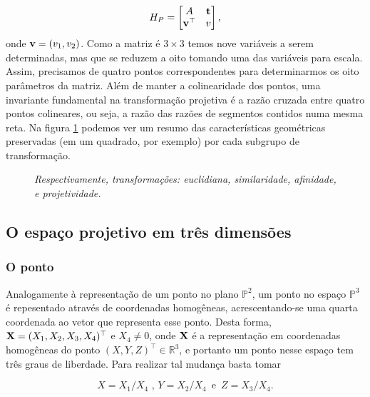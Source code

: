 \begin{equation*}
H_P=
\begin{bmatrix}
A&{\bf t}\\
{\bf v}^\top&v
\end{bmatrix},
\end{equation*}
onde ${\bf v}=(v_1,v_2)$. Como a matriz é $3\times3$ temos nove variáveis a serem determinadas, mas que se reduzem a oito tomando uma das variáveis para escala. Assim, precisamos de quatro pontos correspondentes para determinarmos os oito parâmetros da matriz. Além de manter a colinearidade dos pontos, uma invariante fundamental na transformação projetiva é a razão cruzada entre quatro pontos colineares, ou seja, a razão das razões de segmentos contidos numa mesma reta. Na figura \ref{fig.transformacoes-2D} podemos ver um resumo das características geométricas preservadas (em um quadrado, por exemplo) por cada subgrupo de transformação.   

\begin{figure}[!htb]
\centering
{}
\qquad
{}
\qquad
{}
\qquad
{}
\caption{\textit{Respectivamente, transformações: euclidiana, similaridade, afinidade, e projetividade.}}
\label{fig.transformacoes-2D}
\end{figure}

\subsection{O espaço projetivo em três dimensões}\label{sec.espaco-P3}


\subsubsection*{O ponto} 


Analogamente à representação de um ponto no plano $\mathbb{P}^2$, um ponto no espaço $\mathbb{P}^3$ é repesentado através de coordenadas homogêneas, acrescentando-se uma quarta coordenada ao vetor que representa esse ponto. Desta forma, $\mathbf{X} = (X_1,X_2,X_3,X_4)^\top$ e $X_4 \ne 0$, onde $\mathbf{X}$ é a representação em coordenadas homogêneas do ponto $(X,Y,Z)^\top \in \mathbb{R}^3$, e portanto um ponto nesse espaço tem três graus de liberdade. Para realizar tal mudança basta tomar 

\begin{equation*}
X=X_1/X_4 \,\, ,\, Y=X_2/X_4 \,\,\, \text{e} \,\,\, Z=X_3/X_4.
\end{equation*}

